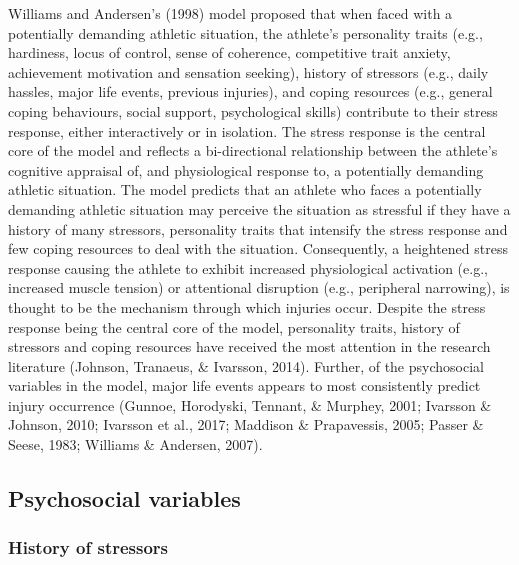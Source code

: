 \documentclass[
  english,
  man,floatsintext]{apa6}
\begin{document}
Williams and Andersen's (1998) model proposed that when faced with a potentially demanding athletic situation, the athlete's personality traits (e.g., hardiness, locus of control, sense of coherence, competitive trait anxiety, achievement motivation and sensation seeking), history of stressors (e.g., daily hassles, major life events, previous injuries), and coping resources (e.g., general coping behaviours, social support, psychological skills) contribute to their stress response, either interactively or in isolation.
The stress response is the central core of the model and reflects a bi-directional relationship between the athlete's cognitive appraisal of, and physiological response to, a potentially demanding athletic situation.
The model predicts that an athlete who faces a potentially demanding athletic situation may perceive the situation as stressful if they have a history of many stressors, personality traits that intensify the stress response and few coping resources to deal with the situation.
Consequently, a heightened stress response causing the athlete to exhibit increased physiological activation (e.g., increased muscle tension) or attentional disruption (e.g., peripheral narrowing), is thought to be the mechanism through which injuries occur.
Despite the stress response being the central core of the model, personality traits, history of stressors and coping resources have received the most attention in the research literature (Johnson, Tranaeus, \& Ivarsson, 2014).
Further, of the psychosocial variables in the model, major life events appears to most consistently predict injury occurrence (Gunnoe, Horodyski, Tennant, \& Murphey, 2001; Ivarsson \& Johnson, 2010; Ivarsson et al., 2017; Maddison \& Prapavessis, 2005; Passer \& Seese, 1983; Williams \& Andersen, 2007).

\hypertarget{psychosocial-variables}{%
\subsection{Psychosocial variables}\label{psychosocial-variables}}

\hypertarget{history-of-stressors}{%
\subsubsection{History of stressors}\label{history-of-stressors}}
\end{document}
